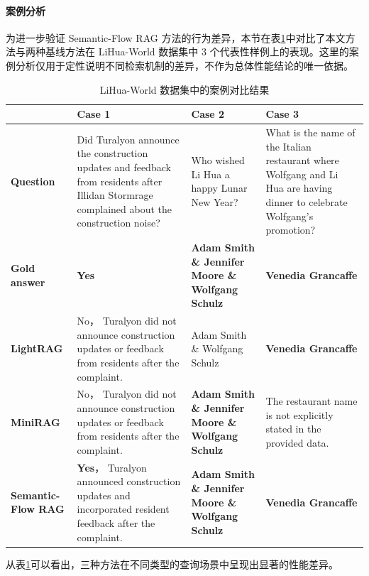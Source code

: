 \documentclass[promaster, vlined]{DissertUESTC}
\begin{document}
\paragraph{案例分析}
为进一步验证 Semantic-Flow RAG 方法的行为差异，本节在表\ref{tab:case_analysis}中对比了本文方法与两种基线方法在 LiHua-World 数据集中 3 个代表性样例上的表现。这里的案例分析仅用于定性说明不同检索机制的差异，不作为总体性能结论的唯一依据。
\begin{table}[!ht]
\centering
\caption{LiHua-World 数据集中的案例对比结果}
\label{tab:case_analysis}
\small
\renewcommand{\arraystretch}{1.2}
\setlength{\tabcolsep}{2pt}
\begin{tabular}{>{\raggedright\arraybackslash}p{2.15cm}|>{\raggedright\arraybackslash}p{3.35cm}|>{\raggedright\arraybackslash}p{3.35cm}|>{\raggedright\arraybackslash}p{3.35cm}}
\hline
 & \centering\arraybackslash\textbf{Case 1} & \centering\arraybackslash\textbf{Case 2} & \centering\arraybackslash\textbf{Case 3} \\
\hline
\textbf{Question} &
Did Turalyon announce the construction updates and feedback from residents after Illidan Stormrage complained about the construction noise? &
Who wished Li Hua a happy Lunar New Year? &
What is the name of the Italian restaurant where Wolfgang and Li Hua are having dinner to celebrate Wolfgang's promotion? \\
\hline
\textbf{Gold answer} &
\textbf{Yes} &
\textbf{Adam Smith \& Jennifer Moore \& Wolfgang Schulz} &
\textbf{Venedia Grancaffe} \\
\hline
\textbf{LightRAG} &
No， Turalyon did not announce construction updates or feedback from residents after the complaint. &
Adam Smith \& Wolfgang Schulz &
\textbf{Venedia Grancaffe} \\
\hline
\textbf{MiniRAG} &
No， Turalyon did not announce construction updates or feedback from residents after the complaint. &
\textbf{Adam Smith \& Jennifer Moore \& Wolfgang Schulz} &
The restaurant name is not explicitly stated in the provided data. \\
\hline
\textbf{Semantic-Flow RAG} &
\textbf{Yes}， Turalyon announced construction updates and incorporated resident feedback after the complaint. &
\textbf{Adam Smith \& Jennifer Moore \& Wolfgang Schulz} &
\textbf{Venedia Grancaffe} \\
\hline
\end{tabular}
\end{table}

从表\ref{tab:case_analysis}可以看出，三种方法在不同类型的查询场景中呈现出显著的性能差异。
\end{document}
